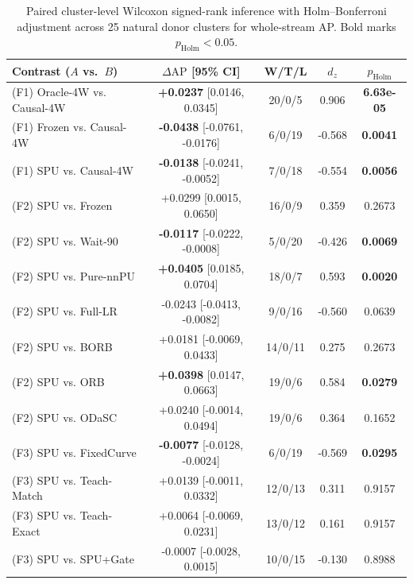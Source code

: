\documentclass[pdflatex,sn-basic]{sn-jnl}
\theoremstyle{definition}
\theoremstyle{plain}
\begin{document}
\begin{table}[t]
\centering
\caption{Paired cluster-level Wilcoxon signed-rank inference with Holm--Bonferroni adjustment across 25 natural donor clusters for whole-stream AP. Bold marks $p_{\mathrm{Holm}} < 0.05$.}
\label{tab:bench_b_holm}
\fontsize{7.5}{9.0}\selectfont
\setlength{\tabcolsep}{2.0pt}
\begin{tabular*}{\textwidth}{@{\extracolsep\fill}lcccc@{}}
\toprule
\textbf{Contrast ($A$ vs.\ $B$)} & \textbf{$\Delta\mathrm{AP}$ [95\% CI]} & \textbf{W/T/L} & \textbf{$d_z$} & \textbf{$p_{\mathrm{Holm}}$} \\
\midrule
(F1) Oracle-4W vs. Causal-4W & \textbf{+0.0237} [0.0146, 0.0345] & 20/0/5 & 0.906 & \textbf{6.63e-05} \\
(F1) Frozen vs. Causal-4W & \textbf{-0.0438} [-0.0761, -0.0176] & 6/0/19 & -0.568 & \textbf{0.0041} \\
(F1) SPU vs. Causal-4W & \textbf{-0.0138} [-0.0241, -0.0052] & 7/0/18 & -0.554 & \textbf{0.0056} \\
\midrule
(F2) SPU vs. Frozen & +0.0299 [0.0015, 0.0650] & 16/0/9 & 0.359 & 0.2673 \\
(F2) SPU vs. Wait-90 & \textbf{-0.0117} [-0.0222, -0.0008] & 5/0/20 & -0.426 & \textbf{0.0069} \\
(F2) SPU vs. Pure-nnPU & \textbf{+0.0405} [0.0185, 0.0704] & 18/0/7 & 0.593 & \textbf{0.0020} \\
(F2) SPU vs. Full-LR & -0.0243 [-0.0413, -0.0082] & 9/0/16 & -0.560 & 0.0639 \\
(F2) SPU vs. BORB & +0.0181 [-0.0069, 0.0433] & 14/0/11 & 0.275 & 0.2673 \\
(F2) SPU vs. ORB & \textbf{+0.0398} [0.0147, 0.0663] & 19/0/6 & 0.584 & \textbf{0.0279} \\
(F2) SPU vs. ODaSC & +0.0240 [-0.0014, 0.0494] & 19/0/6 & 0.364 & 0.1652 \\
\midrule
(F3) SPU vs. FixedCurve & \textbf{-0.0077} [-0.0128, -0.0024] & 6/0/19 & -0.569 & \textbf{0.0295} \\
(F3) SPU vs. Teach-Match & +0.0139 [-0.0011, 0.0332] & 12/0/13 & 0.311 & 0.9157 \\
(F3) SPU vs. Teach-Exact & +0.0064 [-0.0069, 0.0231] & 13/0/12 & 0.161 & 0.9157 \\
(F3) SPU vs. SPU+Gate & -0.0007 [-0.0028, 0.0015] & 10/0/15 & -0.130 & 0.8988 \\
\bottomrule
\end{tabular*}
\end{table}
\end{document}
